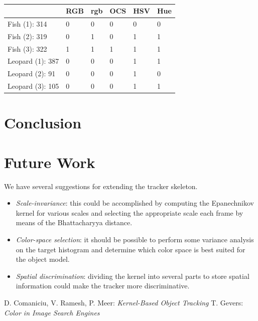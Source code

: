 \documentclass[a4paper,11pt]{article}
\begin{document}
		\begin{table}[H]
			\centering
			\begin{tabular}{ | l | l | l | l | l | l |}
			\hline
			                   & RGB & rgb & OCS & HSV & Hue \\
			\hline
			Fish    (1): 314   & 0   & 0   & 0   & 0   & 0 \\
			Fish    (2): 319   & 0   & 1   & 0   & 1   & 1 \\
			Fish    (3): 322   & 1   & 1   & 1   & 1   & 1 \\
			Leopard (1): 387   & 0   & 0   & 0   & 1   & 1 \\
			Leopard (2):  91   & 0   & 0   & 0   & 1   & 0 \\
			Leopard (3): 105   & 0   & 0   & 0   & 1   & 1 \\
			\hline
			\end{tabular}
			\caption{}
		\end{table}
		\noindent

	\section{Conclusion}

	\section{Future Work}
		We have several suggestions for extending the tracker skeleton.

		\begin{itemize}
		\item{
			\emph{Scale-invariance}: this could be accomplished by computing the
			Epanechnikov kernel for various scales and selecting the appropriate
			scale each frame by means of the Bhattacharyya distance.
		}
		\item{
			\emph{Color-space selection}: it should be possible to perform some
			variance analysis on the target histogram and determine which color
			space is best suited for the object model.
		}
		\item{
			\emph{Spatial discrimination}: dividing the kernel into several parts
			to store spatial information could make the tracker more discriminative.
		}
		\end{itemize}

	\begin{thebibliography}{2}
			D. Comaniciu, V. Ramesh, P. Meer: \textit{Kernel-Based Object Tracking}
			T. Gevers: \textit{Color in Image Search Engines}
	\end{thebibliography}
\end{document}

